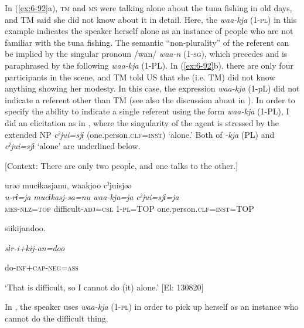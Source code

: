 \begin{table}
      [Co: 110328\_00.txt]
\z

In (\ref{ex:6-92}a), \textsc{tm} and \textsc{ms} were talking alone about the tuna fishing in old days, and TM said she did not know about it in detail. Here, the \textit{waa-kja} (1-\textsc{pl}) in this example indicates the speaker herself alone as an instance of people who are not familiar with the tuna fishing. The semantic “non-plurality” of the referent can be implied by the singular pronoun /wan/ \textit{waa-n} (1-\textsc{sg}), which precedes and is paraphrased by the following \textit{waa-kja} (1-PL). In (\ref{ex:6-92}b), there are only four participants in the scene, and TM told US that she (i.e. TM) did not know anything showing her modesty. In this case, the expression \textit{waa-kja} (1-pL) did not indicate a referent other than TM (see also the discussion about  in ). In order to specify the ability to indicate a single referent using the form \textit{waa-kja} (1-PL), I did an elicitation as in , where the singularity of the agent is stressed by the extended NP \textit{cˀjui=sjɨ} (one.person.\textsc{clf}=\textsc{inst}) ‘alone.’ Both of \textit{-kja} (PL) and \textit{cˀjui=sjɨ} ‘alone’ are underlined below.

\ea\label{ex:6-93}
  [Context: There are only two people, and one talks to the other.]

{\TM}
\glll urəə  mucɨkasjanu,  waakjoo  cˀjuisjəə\\
\textit{u-rɨ=ja}  \textit{mucɨkasj-sa=nu}  \textit{waa-kja=ja}  \textit{cˀjui=sjɨ=ja}\\

    \textsc{mes}-\textsc{nlz}=\textsc{top}  difficult-\textsc{adj}=\textsc{csl}  1-\textsc{pl}=TOP  one.person.\textsc{clf}=\textsc{inst}=TOP

    siikijandoo.

    \textit{sɨr-i+kij-an=doo}

    do-\textsc{inf}+\textsc{cap}-\textsc{neg}=\textsc{ass}

\glt    ‘That is difficult, so I cannot do (it) alone.’ [El: 130820]

In , the speaker uses \textit{waa-kja} (1-\textsc{pl}) in order to pick up herself as an instance who cannot do the difficult thing.


\end{table}
